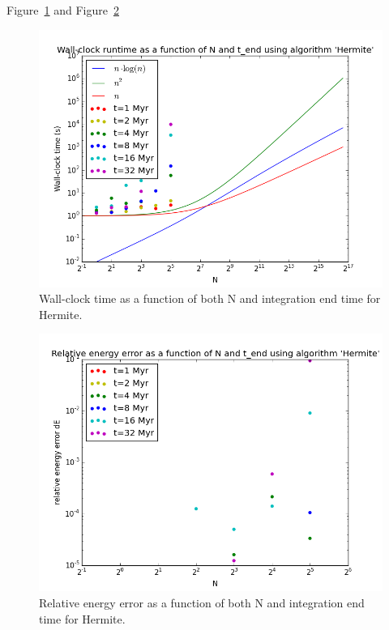\documentclass{aa}
\begin{document}
   Figure~\ref{fig:Hermite_runtime} and Figure~\ref{fig:Hermite_dE}


   \begin{figure}
   \centering
   \includegraphics[width=\hsize]{../GravitationalDynamics/plots/CA_GD_TLRH_s1603221_SS_s1617451_Hermite_runtime.png}
      \caption{Wall-clock time as a function of both N and integration 
               end time for Hermite.
              }
         \label{fig:Hermite_runtime}
   \end{figure}
   
   \begin{figure}
   \centering
   \includegraphics[width=\hsize]{../GravitationalDynamics/plots/CA_GD_TLRH_s1603221_SS_s1617451_Hermite_dE.png}
      \caption{Relative energy error as a function of both N and integration 
               end time for Hermite.
              }
         \label{fig:Hermite_dE}
   \end{figure}
\end{document}
